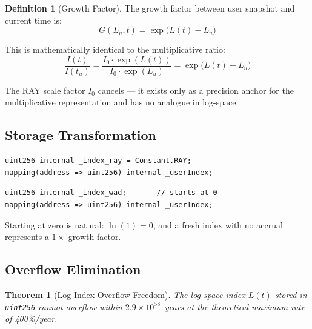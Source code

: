 \documentclass[10pt,a4paper,twocolumn]{article}
\theoremstyle{definition}
\newtheorem{definition}{Definition}[section]
\theoremstyle{plain}
\newtheorem{theorem}{Theorem}[section]
\theoremstyle{remark}
\begin{document}
\begin{definition}[Growth Factor]
\label{def:growth}
The growth factor between user snapshot and current time is:
\begin{equation}
\label{eq:growth-factor}
G(L_u, t) = \exp\bigl(L(t) - L_u\bigr)
\end{equation}
\end{definition}

This is mathematically identical to the multiplicative ratio:
\begin{equation}
\label{eq:equivalence}
\frac{I(t)}{I(t_u)} = \frac{I_0 \cdot \exp(L(t))}{I_0 \cdot \exp(L_u)} = \exp\bigl(L(t) - L_u\bigr)
\end{equation}

The RAY scale factor $I_0$ cancels --- it exists only as a precision anchor for the multiplicative representation and has no analogue in log-space.

\subsection{Storage Transformation}
\label{subsec:storage}

\begin{lstlisting}[language=Solidity, caption={Multiplicative RAY index (before)}, label={lst:ray-storage}]
uint256 internal _index_ray = Constant.RAY;
mapping(address => uint256) internal _userIndex;
\end{lstlisting}

\begin{lstlisting}[language=Solidity, caption={Log-space WAD index (after)}, label={lst:log-storage}]
uint256 internal _index_wad;       // starts at 0
mapping(address => uint256) internal _userIndex;
\end{lstlisting}

Starting at zero is natural: $\ln(1) = 0$, and a fresh index with no accrual represents a $1\times$ growth factor.

\subsection{Overflow Elimination}
\label{subsec:overflow-elim}

\begin{theorem}[Log-Index Overflow Freedom]
\label{thm:overflow}
The log-space index $L(t)$ stored in \texttt{uint256} cannot overflow within $2.9 \times 10^{58}$~years at the theoretical maximum rate of 400\%/year.
\end{theorem}
\end{document}
